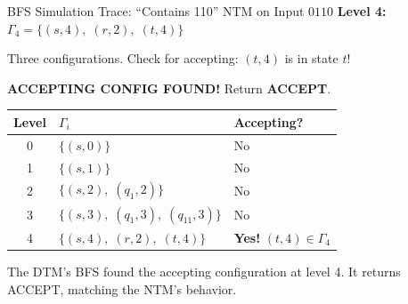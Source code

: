 \begin{examplebox}{BFS Simulation Trace: ``Contains 110'' NTM on Input $0110$}
\textbf{Level 4:} $\Gamma_4 = \{(s, 4),\; (r, 2),\; (t, 4)\}$

Three configurations. Check for accepting: $(t, 4)$ is in state $t$!

\textbf{ACCEPTING CONFIG FOUND!} Return \textbf{ACCEPT}.

\begin{center}
\renewcommand{\arraystretch}{1.3}
\begin{tabular}{cll}
\toprule
\textbf{Level} & \textbf{$\Gamma_i$} & \textbf{Accepting?} \\
\midrule
0 & $\{(s, 0)\}$ & No \\
1 & $\{(s, 1)\}$ & No \\
2 & $\{(s, 2),\; (q_1, 2)\}$ & No \\
3 & $\{(s, 3),\; (q_1, 3),\; (q_{11}, 3)\}$ & No \\
4 & $\{(s, 4),\; (r, 2),\; (t, 4)\}$ & \textbf{Yes!} $(t, 4) \in \Gamma_4$ \\
\bottomrule
\end{tabular}
\end{center}

The DTM's BFS found the accepting configuration at level 4. It returns ACCEPT,
matching the NTM's behavior.

\end{examplebox}

